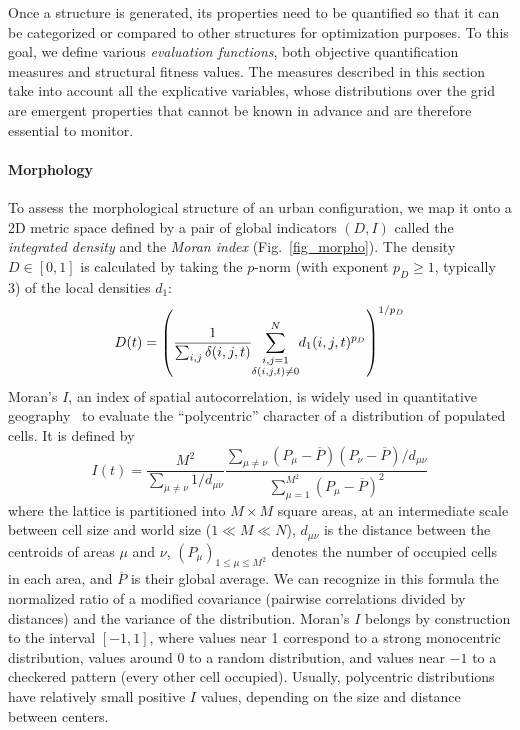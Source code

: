 Once a structure is generated, its properties need to be quantified so that it can be categorized or compared to other structures for optimization purposes. To this goal, we define various \emph{evaluation functions}, both objective quantification measures and structural fitness values. The measures described in this section take into account all the explicative variables, whose distributions over the grid are emergent properties that cannot be known in advance and are therefore essential to monitor.

\paragraph{Morphology}

To assess the morphological structure of an urban configuration, we map it onto a 2D metric space defined by a pair of global indicators $(D,I)$ called the \emph{integrated density} and the \emph{Moran index} (Fig.~\ref{fig_morpho}). The density $D\in[0,1]$ is calculated by taking the $p$-norm (with exponent $p_D\geq 1$, typically 3) of the local densities $d_1$:
\begin{equation}
D(t)=\left(\frac{1}{\sum_{i,j} \delta(i,j,t)}\!\!\sum_{\scriptstyle i,j=1\atop\scriptstyle\delta(i,j,t)\neq0}^N\!\!d_1(i,j,t)^{p_D}\right)^{1/p_D}
\end{equation}
%
\noindent Moran's $I$, an index of spatial autocorrelation, is widely used in quantitative geography~\cite{tsai2005quantifying,lenechet:hal-00696445} to evaluate the ``polycentric'' character of a distribution of populated cells. It is defined by
%
\begin{equation}
I(t)=\frac{M^2}{\sum_{\mu\neq\nu} 1/d_{\mu\nu}}\frac{\sum_{\mu\neq\nu} (P_\mu-\overline{P})(P_\nu-\overline{P})/d_{\mu\nu}}{\sum_{\mu=1}^{M^2}(P_\mu-\overline{P})^2}
\end{equation}
%
where the lattice is partitioned into $M\times M$ square areas, at an intermediate scale between cell size and world size ($1\ll\!M\ll\!N$), $d_{\mu\nu}$ is the distance between the centroids of areas $\mu$ and $\nu$, $(P_\mu)_{1\leq\mu\leq M^2}$ denotes the number of occupied cells in each area, and $\overline{P}$ is their global average. We can recognize in this formula the normalized ratio of a modified covariance (pairwise correlations divided by distances) and the variance of the distribution. Moran's $I$ belongs by construction to the interval $[-1,1]$, where values near 1 correspond to a strong monocentric distribution, values around 0 to a random distribution, and values near $-1$ to a checkered pattern (every other cell occupied). Usually, polycentric distributions have relatively small positive $I$ values, depending on the size and distance between centers.


